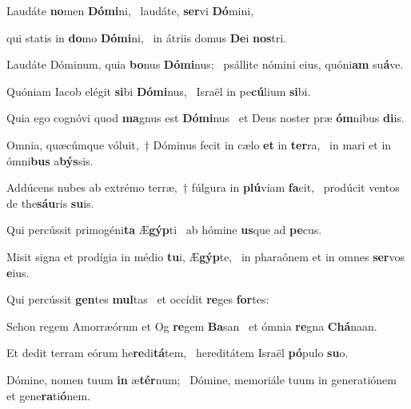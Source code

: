 \item Laudáte \textbf{no}men \textbf{Dó}\textbf{mi}ni,~\psstar{} laudáte, \textbf{ser}vi \textbf{Dó}mini,

\item qui statis in \textbf{do}mo \textbf{Dó}\textbf{mi}ni,~\psstar{} in átriis domus \textbf{De}i \textbf{nos}tri.

\item Laudáte Dóminum, quia \textbf{bo}nus \textbf{Dó}\textbf{mi}nus;~\psstar{} psállite nómini eius, quóni\textbf{am} su\textbf{á}ve.

\item Quóniam Iacob elégit \textbf{si}bi \textbf{Dó}\textbf{mi}nus,~\psstar{} Israël in pe\textbf{cú}lium \textbf{si}bi.

\item Quia ego cognóvi quod \textbf{ma}gnus est \textbf{Dó}\textbf{mi}nus~\psstar{} et Deus noster præ \textbf{óm}nibus \textbf{di}is.

\item Omnia, quæcúmque vóluit,~† Dóminus fecit in cælo \textbf{et} in \textbf{ter}ra,~\psstar{} in mari et in ómni\textbf{bus} a\textbf{býs}sis.

\item Addúcens nubes ab extrémo terræ,~† fúlgura in \textbf{plú}viam \textbf{fa}cit,~\psstar{} prodúcit ventos de the\textbf{sáu}ris \textbf{su}is.

\item Qui percússit primogéni\textbf{ta} Æ\textbf{gýp}ti~\psstar{} ab hómine \textbf{us}que ad \textbf{pe}cus.

\item Misit signa et prodígia in médio \textbf{tu}i, Æ\textbf{gýp}te,~\psstar{} in pharaónem et in omnes \textbf{ser}vos \textbf{e}ius.

\item Qui percússit \textbf{gen}tes \textbf{mul}tas~\psstar{} et occídit \textbf{re}ges \textbf{for}tes:

\item Sehon regem Amorræórum et Og \textbf{re}gem \textbf{Ba}san~\psstar{} et ómnia \textbf{re}gna \textbf{Chá}naan.

\item Et dedit terram eórum he\textbf{re}di\textbf{tá}tem,~\psstar{} hereditátem Israël \textbf{pó}pulo \textbf{su}o.

\item Dómine, nomen tuum \textbf{in} æ\textbf{tér}num;~\psstar{} Dómine, memoriále tuum in generatiónem et gene\textbf{ra}ti\textbf{ó}nem.

